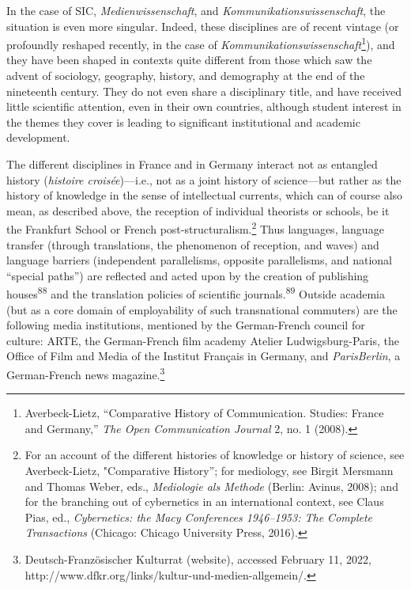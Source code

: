 \documentclass{tufte-handout}
\begin{document}
In the case of SIC, \emph{Medienwissenschaft}, and
\emph{Kommunikationswissenschaft}, the situation is even more singular.
Indeed, these disciplines are of recent vintage (or profoundly reshaped
recently, in the case of \emph{Kommunikationswissenschaft}\footnote{Averbeck-Lietz,
  ``Comparative History of Communication. Studies: France and Germany,''
  \emph{The Open Communication Journal} 2, no. 1 (2008).}), and they
have been shaped in contexts quite different from those which saw the
advent of sociology, geography, history, and demography at the end of
the nineteenth century. They do not even share a disciplinary title, and
have received little scientific attention, even in their own countries,
although student interest in the themes they cover is leading to
significant institutional and academic development.

The different disciplines in France and in Germany interact not as
entangled history (\emph{histoire croisée})---i.e., not as a joint
history of science---but rather as the history of knowledge in the sense
of intellectual currents, which can of course also mean, as described
above, the reception of individual theorists or schools, be it the
Frankfurt School or French post-structuralism.\footnote{For an account
  of the different histories of knowledge or history of science, see
  Averbeck-Lietz, "Comparative History''; for mediology, see Birgit
  Mersmann and Thomas Weber, eds., \emph{Mediologie als Methode}
  (Berlin: Avinus, 2008); and for the branching out of cybernetics in an
  international context, see Claus Pias, ed., \emph{Cybernetics: the
  Macy Conferences 1946--1953: The Complete Transactions} (Chicago:
  Chicago University Press, 2016).} Thus languages, language transfer
(through translations, the phenomenon of reception, and waves) and
language barriers (independent parallelisms, opposite parallelisms, and
national ``special paths'') are reflected and acted upon by the creation
of publishing houses\textsuperscript{88} and the translation policies of scientific
journals.\textsuperscript{89} Outside academia (but as a core domain of
employability of such transnational commuters) are the following media
institutions, mentioned by the German-French council for culture: ARTE,
the German-French film academy Atelier Ludwigsburg-Paris, the Office of
Film and Media of the Institut Français in Germany, and
\emph{ParisBerlin}, a German-French news magazine.\footnote{Deutsch-Französischer
  Kulturrat (website), accessed February 11, 2022,
  http://www.dfkr.org/links/kultur-und-medien-allgemein/.}
\end{document}
